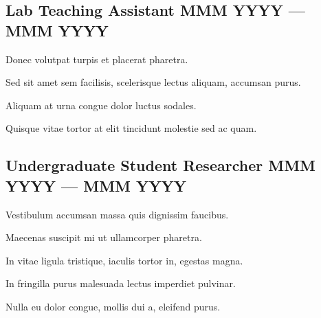 \documentclass[letter,10pt]{article}
\begin{document}
\subsection{{Lab Teaching Assistant \hfill MMM YYYY --- MMM YYYY}}
\begin{zitemize}
\item Donec volutpat turpis et placerat pharetra.
\item Sed sit amet sem facilisis, scelerisque lectus aliquam, accumsan purus.
\item Aliquam at urna congue dolor luctus sodales.
\item Quisque vitae tortor at elit tincidunt molestie sed ac quam.
\end{zitemize}

\subsection{{Undergraduate Student Researcher \hfill MMM YYYY --- MMM YYYY}}
\begin{zitemize}
\item Vestibulum accumsan massa quis dignissim faucibus.
\item Maecenas suscipit mi ut ullamcorper pharetra.
\item In vitae ligula tristique, iaculis tortor in, egestas magna.
\item In fringilla purus malesuada lectus imperdiet pulvinar.
\item Nulla eu dolor congue, mollis dui a, eleifend purus.
\end{zitemize}

\end{document}
